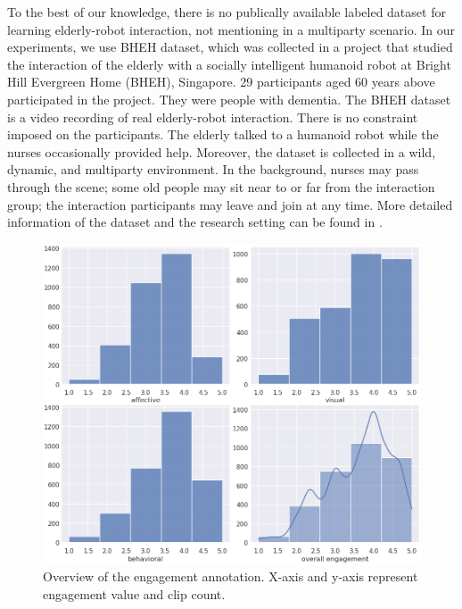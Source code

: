 \documentclass[twocolumn]{svjour3}
\begin{document}
To the best of our knowledge, there is no publically available labeled dataset for learning elderly-robot interaction, not mentioning in a multiparty scenario. In our experiments, we use BHEH dataset, which was collected in a project that studied the interaction of the elderly with a socially intelligent humanoid robot at Bright Hill Evergreen Home (BHEH), Singapore. 
29 participants aged 60 years above participated in the project. They were people with dementia. The BHEH dataset  is a video recording of real elderly-robot interaction. There is no constraint imposed on the participants. The elderly talked to a humanoid robot while the nurses occasionally provided help. Moreover, the dataset is collected in a wild, dynamic, and multiparty environment. In the background, nurses may pass through the scene; some old people may sit near to or far from the interaction group; the interaction participants may leave and join at any time. 
More detailed information of the dataset and the research setting can be found in \cite{Mishra2021Does, Tulsulkar2021Can}.

\begin{figure}[t]
  \centering
  \includegraphics[width=\linewidth]{assets/label_overview}
  \caption{Overview of the engagement annotation. X-axis and y-axis represent engagement value and clip count.}
  \label{f:label_overview}
\end{figure}
\end{document}

